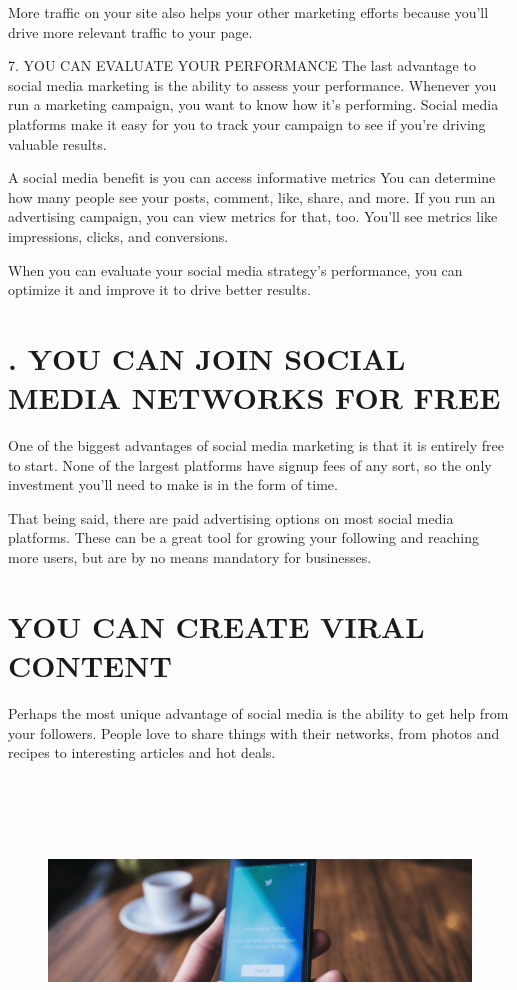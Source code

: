 \documentclass[a4paper]{article}
\begin{document}
More traffic on your site also helps your other marketing efforts because you’ll drive more relevant traffic to your page.

7. YOU CAN EVALUATE YOUR PERFORMANCE
The last advantage to social media marketing is the ability to assess your performance. Whenever you run a marketing campaign, you want to know how it’s performing. Social media platforms make it easy for you to track your campaign to see if you’re driving valuable results.

A social media benefit is you can access informative metrics
You can determine how many people see your posts, comment, like, share, and more. If you run an advertising campaign, you can view metrics for that, too. You’ll see metrics like impressions, clicks, and conversions.

When you can evaluate your social media strategy’s performance, you can optimize it and improve it to drive better results.
  
  \newpage
  
  \section{. YOU CAN JOIN SOCIAL MEDIA NETWORKS FOR FREE}
 One of the biggest advantages of social media marketing is that it is entirely free to start. None of the largest platforms have signup fees of any sort, so the only investment you’ll need to make is in the form of time.

That being said, there are paid advertising options on most social media platforms. These can be a great tool for growing your following and reaching more users, but are by no means mandatory for businesses.
  
 \section{ YOU CAN CREATE VIRAL CONTENT}
Perhaps the most unique advantage of social media is the ability to get help from your followers. People love to share things with their networks, from photos and recipes to interesting articles and hot deals.
\begin{figure}[h]
\centering
\includegraphics[width=4.5in,height=3in]{as}
\end{figure}
\end{document}
